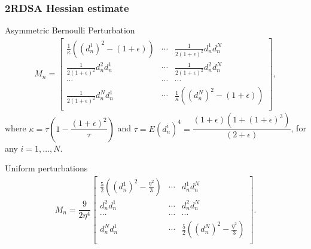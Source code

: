 \begin{frame}[shrink=10]
\begin{small}
\frametitle{\centering  2RDSA Hessian estimate}
\begin{block}{Asymmetric Bernoulli Perturbation}
\begin{align}
\label{eq:2rdsa-estimate-ber}
 M_n =
\left[
\begin{array}{ccc}
\frac{1}{\kappa}\left((d_n^1)^2\!-(1+\epsilon)\right) & \cdots & \frac{1}{2(1+\epsilon)^2}d_n^1 d_n^N\\
\frac{1}{2(1+\epsilon)^2}d_n^2 d_n^1  &  \cdots & \frac{1}{2(1+\epsilon)^2}d_n^2 d_n^N\\
\cdots&\cdots&\cdots\\
\frac{1}{2(1+\epsilon)^2}d_n^N d_n^1 & \cdots &  \frac{1}{\kappa}\left((d_n^N)^2-(1+\epsilon)\right) \\
\end{array}
\right],
\end{align}
where $\kappa = \tau \left(1- \dfrac{(1+\epsilon)^2}{\tau}\right)$ and $\tau = E (d_n^i)^4= \dfrac{(1+\epsilon)(1+(1+\epsilon)^3)}{(2+\epsilon)}$, for any $i=1,\ldots,N$. 
\end{block}
\begin{block}{Uniform perturbations}
\begin{align}
\label{eq:2rdsa-estimate-unif}
M_n =
\dfrac{9}{2\eta^4}\left[
\begin{array}{cccc}
\frac{5}{2}\left((d_n^1)^2-\frac{\eta^2}{3}\right) & \cdots & d_n^1 d_n^N\\
d_n^2 d_n^1  &  \cdots & d_n^2 d_n^N\\
\cdots&\cdots&\cdots\\
d_n^N d_n^1 & \cdots &  \frac{5}{2}\left((d_n^N)^2-\frac{\eta^2}{3}\right) \\
\end{array}
\right].
\end{align}
\end{block}

\end{small}
\end{frame}





